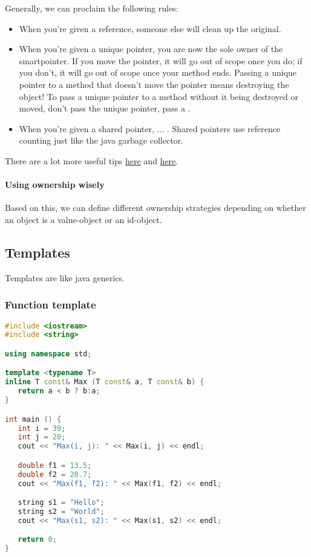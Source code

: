 Generally, we can proclaim the following rules:
\begin{itemize}
    \item When you're given a reference, someone else will clean up the original. 
    \item When you're given a unique pointer, you are now the sole owner of the smartpointer. If you move the pointer, it will go out of scope once you do; if you don't, it will go out of scope once your method ends. Passing a unique pointer to a method that doesn't move the pointer means destroying the object! To pass a unique pointer to a method without it being destroyed or moved, don't pass the unique pointer, pass a .
    \item When you're given a shared pointer, ... . Shared pointers use reference counting just like the java garbage collector.  
\end{itemize}
There are a lot more useful tips \hyperlink{https://herbsutter.com/2013/06/05/gotw-91-solution-smart-pointer-parameters/}{here} and \hyperlink{https://stackoverflow.com/questions/8114276/how-do-i-pass-a-unique-ptr-argument-to-a-constructor-or-a-function}{here}.


\paragraph{Using ownership wisely} Based on this, we can define different ownership strategies depending on whether an object is a value-object or an id-object. 


\subsection{Templates}
Templates are like java generics. 

\subsubsection{Function template}

\begin{lstlisting}[language=c++]
#include <iostream>
#include <string>

using namespace std;

template <typename T>
inline T const& Max (T const& a, T const& b) { 
   return a < b ? b:a; 
}

int main () {
   int i = 39;
   int j = 20;
   cout << "Max(i, j): " << Max(i, j) << endl; 

   double f1 = 13.5; 
   double f2 = 20.7; 
   cout << "Max(f1, f2): " << Max(f1, f2) << endl; 

   string s1 = "Hello"; 
   string s2 = "World"; 
   cout << "Max(s1, s2): " << Max(s1, s2) << endl; 

   return 0;
}
\end{lstlisting}



